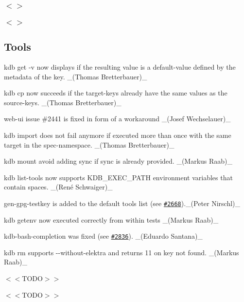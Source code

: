 \subsubsection*{$<$$>$}

\subsubsection*{$<$$>$}

\subsection*{Tools}


\begin{DoxyItemize}
\item {\ttfamily kdb get -\/v} now displays if the resulting value is a default-\/value defined by the metadata of the key. \+\_\+(\+Thomas Bretterbauer)\+\_\+
\item {\ttfamily kdb cp} now succeeds if the target-\/keys already have the same values as the source-\/keys. \+\_\+(\+Thomas Bretterbauer)\+\_\+
\item {\ttfamily web-\/ui} issue \#2441 is fixed in form of a workaround \+\_\+(\+Josef Wechselauer)\+\_\+
\item {\ttfamily kdb import} does not fail anymore if executed more than once with the same target in the spec-\/namespace. \+\_\+(\+Thomas Bretterbauer)\+\_\+
\item {\ttfamily kdb mount} avoid adding sync if sync is already provided. \+\_\+(\+Markus Raab)\+\_\+
\item {\ttfamily kdb list-\/tools} now supports {\ttfamily K\+D\+B\+\_\+\+E\+X\+E\+C\+\_\+\+P\+A\+TH} environment variables that contain spaces. \+\_\+(René Schwaiger)\+\_\+
\item {\ttfamily gen-\/gpg-\/testkey} is added to the default tools list (see \href{https://github.com/ElektraInitiative/libelektra/issues/2668}{\tt \#2668}).\+\_\+(\+Peter Nirschl)\+\_\+
\item {\ttfamily kdb getenv} now executed correctly from within tests \+\_\+(\+Markus Raab)\+\_\+
\item {\ttfamily kdb-\/bash-\/completion} was fixed (see \href{https://github.com/ElektraInitiative/libelektra/pull/2836}{\tt \#2836}). \+\_\+(\+Eduardo Santana)\+\_\+
\item {\ttfamily kdb rm} supports {\ttfamily -\/-\/without-\/elektra} and returns 11 on key not found. \+\_\+(\+Markus Raab)\+\_\+
\item $<$$<$\+T\+O\+D\+O$>$$>$
\item $<$$<$\+T\+O\+D\+O$>$$>$
\end{DoxyItemize}

